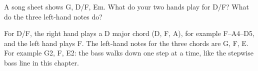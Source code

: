 \begin{exercise}
A song sheet shows G, D/F\sh, Em. What do your two hands play for D/F\sh? What do the three left-hand notes do?
\end{exercise}

\begin{answerbox}
For D/F\sh, the right hand plays a D major chord (D, F\sh, A), for example F--A4--D5, and the left hand plays F\sh. The left-hand notes for the three chords are G, F\sh, E. For example G2, F, E2: the bass walks down one step at a time, like the stepwise bass line in this chapter. 
\end{answerbox}
